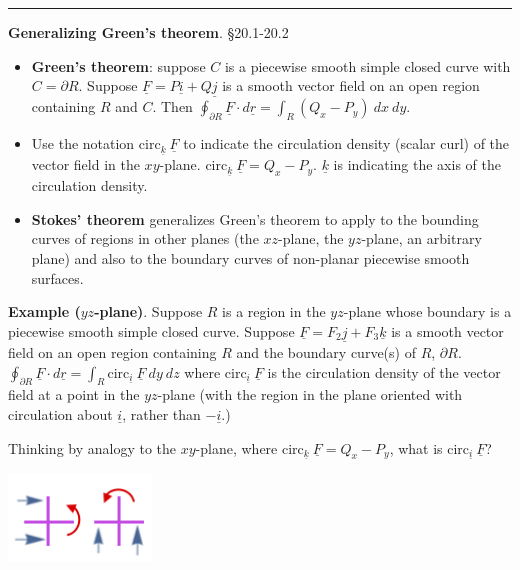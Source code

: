 \documentclass[12pt,letterpaper,noanswers]{exam}
\newcommand{\mb}[1]{\underline{#1}}
\begin{document}
\vspace{0.2cm}
\hrule
\vspace{0.2cm}

\noindent\textbf{Generalizing Green's theorem}. \S 20.1-20.2
\begin{tcolorbox}
\begin{itemize}
\itemsep0em
    \item \textbf{Green's theorem}: suppose $C$ is a piecewise smooth simple closed curve with $C = \partial R$.  Suppose $\mb F = P\mb i + Q\mb j$ is a smooth vector field on an open region containing $R$ and $C$.  Then $\oint_{\partial R} \mb F\cdot d\mb r = \int_R (Q_x - P_y)\ dx\ dy.$
    \item Use the notation $\text{circ}_{\mb k}\ \mb F$ to indicate the circulation density (scalar curl) of the vector field in the $xy$-plane.  $\text{circ}_{\mb k}\ \mb F = Q_x - P_y$.  $\mb k$ is indicating the axis of the circulation density.
    \item \textbf{Stokes' theorem} generalizes Green's theorem to apply to the bounding curves of regions in other planes (the $xz$-plane, the $yz$-plane, an arbitrary plane) and also to the boundary curves of non-planar piecewise smooth surfaces.
\end{itemize}
\end{tcolorbox}

\noindent\textbf{Example ($yz$-plane)}.  Suppose $R$ is a region in the $yz$-plane whose boundary is a piecewise smooth simple closed curve.  Suppose $\mb F = F_2\mb j + F_3\mb k$ is a smooth vector field on an open region containing $R$ and the boundary curve(s) of $R$, $\partial R$.  $\displaystyle\oint_{\partial R} \mb F\cdot d\mb r = \int_R \text{circ}_{\mb i}\ \mb F\ dy\ dz$ where $\text{circ}_{\mb i}\ \mb F$ is the circulation density of the vector field at a point in the $yz$-plane (with the region in the plane oriented with circulation about $\mb i$, rather than $-\mb i$.)

Thinking by analogy to the $xy$-plane, where $\text{circ}_{\mb k}\ \mb F = Q_x - P_y$, what is $\text{circ}_{\mb i}\ \mb F$?

\includegraphics[width=1.5in]{img/C33p1-18.png}

\end{document}
